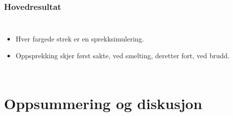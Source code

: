 \documentclass[utf8x, notes, graphics]{beamer}
\begin{document}
\begin{frame}
\frametitle{Hovedresultat}
\begin{columns}
\begin{itemize}
\item Hver fargede strek er en sprekksimulering.
\item Oppsprekking skjer først sakte, ved smelting, deretter fort, ved brudd.
\end{itemize}
\end{columns}

\end{frame}


\section{Oppsummering og diskusjon}
\end{document}
